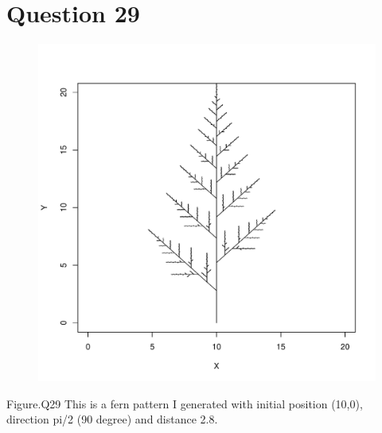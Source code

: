 \documentclass[12pt,a4paper]{article}
\begin{document}
\section{Question 29}
\begin{figure}[h]
\centering
\includegraphics[width=\textwidth]{Q29Plot.pdf}
\end{figure}
Figure.Q29 This is a fern pattern I generated with initial position (10,0), direction pi/2 (90 degree) and distance 2.8.

\newpage
\end{document}
